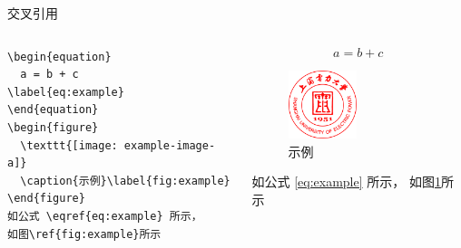 \begin{frame}[fragile]{交叉引用}

  \pause

  \begin{columns}
    \begin{column}{.4\textwidth} 
      \begin{verbatim}
\begin{equation}
  a = b + c
\label{eq:example}
\end{equation}
\begin{figure}
  \texttt{[image: example-image-a]}
  \caption{示例}\label{fig:example}
\end{figure}
如公式 \eqref{eq:example} 所示，
如图\ref{fig:example}所示
      \end{verbatim}
    \end{column}
    \begin{column}{.4\textwidth} \small
      \begin{equation}
        a = b + c
      \label{eq:example}
      \end{equation}
      \begin{figure}
        \includegraphics[width=2cm]{logo/logo.png}
        \caption{示例}\label{figure:example}
      \end{figure}
      如公式 \eqref{eq:example} 所示，
      如图\ref{figure:example}所示
    \end{column}
  \end{columns}
\end{frame}


